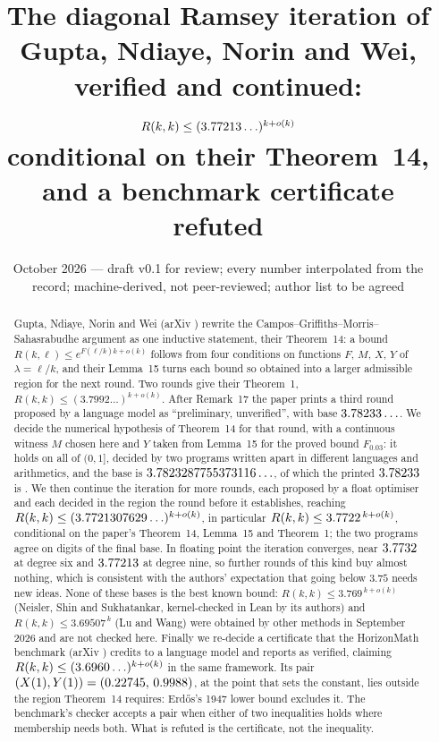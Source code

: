 \documentclass[11pt]{article}
\title{The diagonal Ramsey iteration of Gupta, Ndiaye, Norin and Wei,\\ verified and continued: $R(k,k)\le(3.77213\ldots)^{k+o(k)}$\\ conditional on their Theorem~14, and a benchmark certificate refuted}
\author{\cmauthor}
\date{October 2026 --- draft v0.1 for review; every number interpolated from the record; machine-derived, not peer-reviewed; author list to be agreed}
\begin{document}
\maketitle

\begin{abstract}
Gupta, Ndiaye, Norin and Wei (arXiv \GnnwArxiv) rewrite the Campos--Griffiths--Morris--Sahasrabudhe argument as one inductive statement, their Theorem~14: a bound $R(k,\ell)\le e^{F(\ell/k)k+o(k)}$ follows from four conditions on functions $F$, $M$, $X$, $Y$ of $\lambda=\ell/k$, and their Lemma~15 turns each bound so obtained into a larger admissible region for the next round. Two rounds give their Theorem~1, $R(k,k)\le(3.7992\ldots)^{k+o(k)}$. After Remark~17 the paper prints a third round proposed by a language model as ``preliminary, unverified'', with base $3.78233\ldots$. We decide the numerical hypothesis of Theorem~14 for that round, with a continuous witness $M$ chosen here and $Y$ taken from Lemma~15 for the proved bound $F_{0.03}$: it holds on all of $(0,1]$, decided by two programs written apart in different languages and arithmetics, and the base is $3.7823287755373116\ldots$, of which the printed $3.78233$ is \PrintedIs. We then continue the iteration for \NNew{} more rounds, each proposed by a float optimiser and each decided in the region the round before it establishes, reaching $R(k,k)\le(3.7721307629\ldots)^{k+o(k)}$, in particular $R(k,k)\le3.7722^{\,k+o(k)}$, conditional on the paper's Theorem~14, Lemma~15 and Theorem~1; the two programs agree on \AgreeDigits{} digits of the final base. In floating point the iteration converges, near $3.7732$ at degree six and $3.77213$ at degree nine, so further rounds of this kind buy almost nothing, which is consistent with the authors' expectation that going below $3.75$ needs new ideas. None of these bases is the best known bound: $R(k,k)\le3.769^{\,k+o(k)}$ (Neisler, Shin and Sukhatankar, kernel-checked in Lean by its authors) and $R(k,k)\le3.69507^{\,k}$ (Lu and Wang) were obtained by other methods in September 2026 and are not checked here. Finally we re-decide a certificate that the HorizonMath benchmark (arXiv \HmArxiv) credits to a language model and reports as verified, claiming $R(k,k)\le(3.6960\ldots)^{k+o(k)}$ in the same framework. Its pair $(X(1),Y(1))=(0.22745,\,0.9988)$, at the point that sets the constant, lies outside the region Theorem~14 requires: Erd\H{o}s's 1947 lower bound excludes it. The benchmark's checker accepts a pair when either of two inequalities holds where membership needs both. What is refuted is the certificate, not the inequality.
\end{abstract}
\end{document}
